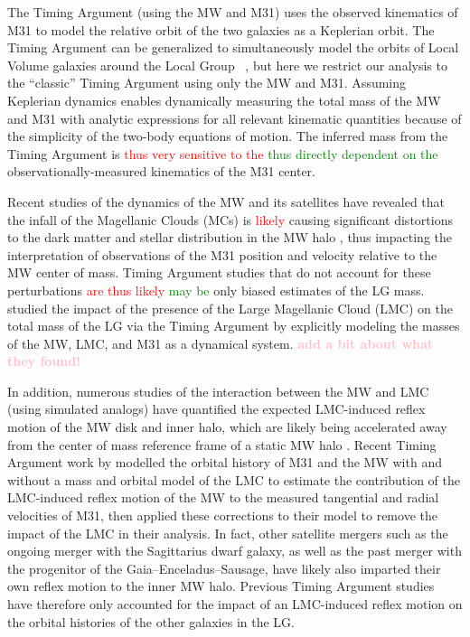 \documentclass[twocolumn]{aastex631}
\newcommand{\kc}[1]{\textcolor{pink}{\textbf{#1}} }
\newcommand{\remove}[1]{\textcolor{red}{#1}}
\newcommand{\add}[1]{\textcolor{green}{#1}}
\begin{document}
The Timing Argument (using the MW and M31) uses the observed kinematics of M31
to model the relative orbit of the two galaxies as a Keplerian orbit.
The Timing Argument can be generalized to simultaneously model the orbits of
Local Volume galaxies around the Local Group
~\citep{Penarrubia2016, Penarrubia2017}, but here we restrict our analysis to
the ``classic'' Timing Argument using only the MW and M31.
Assuming Keplerian dynamics enables dynamically measuring the total mass of the
MW and M31 with analytic expressions for all relevant kinematic quantities
because of the simplicity of the two-body equations of motion.
The inferred mass from the Timing Argument is \remove{thus very sensitive to the} \add{thus directly dependent on the} observationally-measured kinematics of the M31 center.

Recent studies of the dynamics of the MW and its satellites have
revealed that the infall of the Magellanic Clouds (MCs) is \remove{likely} causing
significant distortions to the dark matter and stellar distribution in the MW
halo \citep{Laporte:2018a, Laporte:2018b, Garavito-Camargo:2019, Conroy:2021,
Erkal:2021}, thus impacting the interpretation of observations of the M31
position and velocity relative to the MW center of mass.
Timing Argument studies that do not account for these perturbations \remove{are thus
likely} \add{may be} only biased estimates of the LG mass.
\citet{Penarrubia2016} studied the impact of the presence of the Large
Magellanic Cloud (LMC) on the total mass of the LG via the Timing Argument by
explicitly modeling the masses of the MW, LMC, and M31 as a dynamical system.
\kc{add a bit about what they found!}

In addition, numerous studies of the interaction between the MW and LMC (using
simulated analogs) have quantified the expected LMC-induced reflex motion of the
MW disk and inner halo, which are likely being accelerated away from the center
of mass reference frame of a static MW halo \citep{Gomez2015, Cunningham:2020,
Petersen:2020, Garavito-Camargo2021b}.
Recent Timing Argument work by \cite{Benisty2022} modelled the orbital history
of M31 and the MW with and without a mass and orbital model of the LMC to estimate the
contribution of the LMC-induced reflex motion of the MW to the measured
tangential and radial velocities of M31, then applied these corrections to their
model to remove the impact of the LMC in their analysis.
In fact, other satellite mergers such as the ongoing merger with the Sagittarius
dwarf galaxy, as well as the past merger with the progenitor of the
Gaia--Enceladus--Sausage, have likely also imparted their own reflex motion to
the inner MW halo.
Previous Timing Argument studies have therefore only accounted for the impact of
an LMC-induced reflex motion on the orbital histories of the other galaxies in
the LG.
\end{document}

